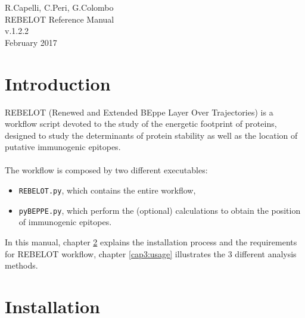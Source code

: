 \documentclass[a4paper,12pt]{book}
\begin{document}
\hypersetup{pageanchor=false}
\begin{titlepage}
\begin{center}
\vspace*{0.5cm}
{\large R.Capelli, C.Peri, G.Colombo}\\
\vspace*{5cm}
{\Large REBELOT Reference Manual}\\
\vspace*{1cm}
{\large v.1.2.2}\\
\vspace*{0.5cm}
{\small February 2017}\\
\end{center}
\end{titlepage}
\tableofcontents
{}
\hypersetup{pageanchor=true}
\chapter{Introduction}
\label{cap1:introduction}
REBELOT (Renewed and Extended BEppe Layer Over Trajectories) is a workflow script devoted to the study of the energetic footprint of proteins, designed to study the determinants of protein stability as well as the location of putative immunogenic epitopes. \\ \\
The workflow is composed by two different executables:
\begin{itemize}
	\item \texttt{REBELOT.py}, which contains the entire workflow,
	\item \texttt{pyBEPPE.py}, which perform the (optional) calculations to obtain the position of immunogenic epitopes.
\end{itemize}
In this manual, chapter \ref{cap2:installation} explains the installation process and the requirements for REBELOT workflow, chapter \ref{cap3:usage} illustrates the 3 different analysis methods.  




\chapter{Installation}
\label{cap2:installation}
\lstset{tabsize=2,basicstyle=\small\ttfamily}
\end{document}
